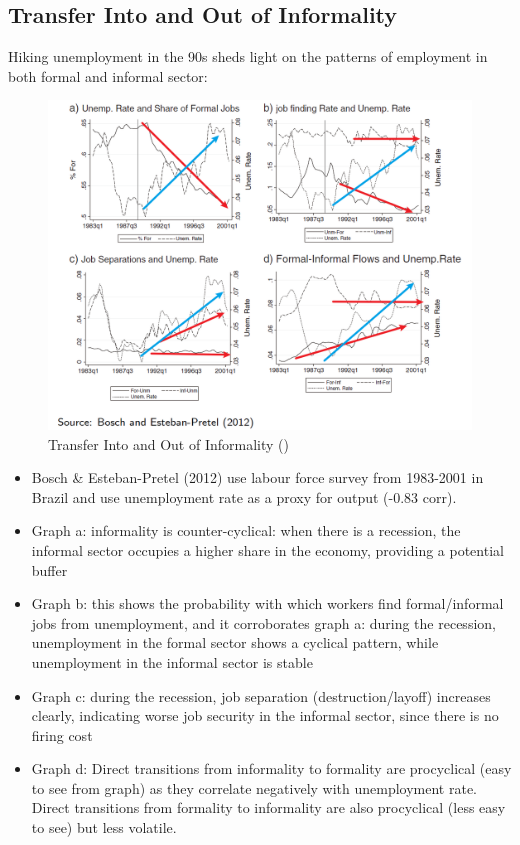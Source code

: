             \subsection{Transfer Into and Out of Informality}
                Hiking unemployment in the 90s sheds light on the patterns of employment in both formal and informal sector:
                \begin{figure}[H]
                    \centering
                    \includegraphics[width=5.5in]{images/ch5/ins and outs of informality.png}
                    \caption{Transfer Into and Out of Informality (\cite{bosch_job_2012})}
                \end{figure}
                \begin{itemize}
                    
                    \item Bosch \& Esteban-Pretel (2012) use labour force survey from 1983-2001 in Brazil and use unemployment rate as a proxy for output (-0.83 corr).
                    \item Graph a: informality is counter-cyclical: when there is a recession, the informal sector occupies a higher share in the economy, providing a potential buffer
                    \item Graph b: this shows the probability with which workers find formal/informal jobs from unemployment, and it corroborates graph a: during the recession, unemployment in the formal sector shows a cyclical pattern, while unemployment in the informal sector is stable
                    \item Graph c: during the recession, job separation (destruction/layoff) increases clearly, indicating worse job security in the informal sector, since there is no firing cost
                    \item Graph d: Direct transitions from informality to formality are procyclical (easy to see from graph) as they correlate negatively with unemployment rate. Direct transitions from formality to informality are also procyclical (less easy to see) but less volatile.
                \end{itemize}
            
